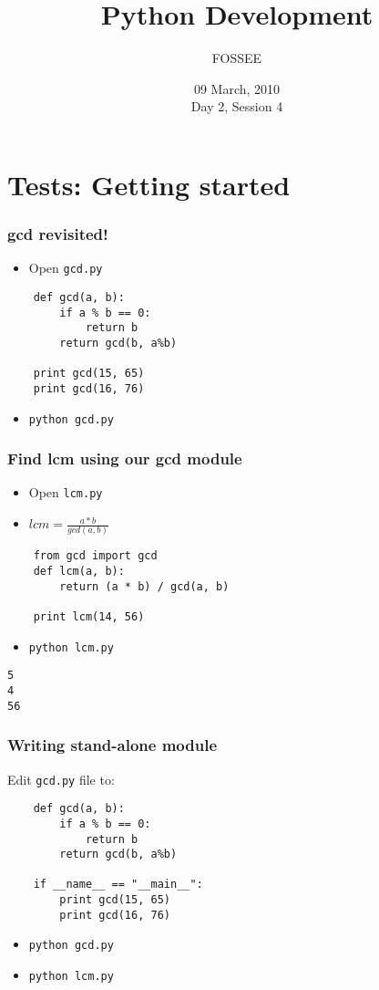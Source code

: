 \documentclass[compress,14pt]{beamer}
\title[Python Development]{Python Development}
\author[FOSSEE] {FOSSEE}
\institute[IIT Bombay] {Department of Aerospace Engineering\\IIT Bombay}
\date[] {09 March, 2010\\Day 2, Session 4}
\begin{document}
\begin{frame}
  \maketitle
\end{frame}

\section{Tests: Getting started}
\begin{frame}[fragile] 
  \frametitle{gcd revisited!}
  \begin{itemize}
  \item Open \texttt{gcd.py}
  \end{itemize}  
\begin{lstlisting}
    def gcd(a, b):
        if a % b == 0: 
            return b
        return gcd(b, a%b)

    print gcd(15, 65)
    print gcd(16, 76)
\end{lstlisting}
  \begin{itemize}
  \item \texttt{python gcd.py}
  \end{itemize}
\end{frame}

\begin{frame}[fragile] 
  \frametitle{Find lcm using our gcd module}
  \begin{itemize}
  \item Open \texttt{lcm.py}  
  \item $lcm = \frac{a * b}{gcd(a,b)}$
  \end{itemize}  
\begin{lstlisting}
    from gcd import gcd    
    def lcm(a, b):
        return (a * b) / gcd(a, b)
    
    print lcm(14, 56)
\end{lstlisting}
  \begin{itemize}
  \item \texttt{python lcm.py}
  \end{itemize}
  \begin{lstlisting}
5
4
56
  \end{lstlisting}    
\end{frame}

\begin{frame}[fragile] 
  \frametitle{Writing stand-alone module}  
Edit \texttt{gcd.py} file to:
\begin{lstlisting}
    def gcd(a, b):
        if a % b == 0: 
            return b
        return gcd(b, a%b)

    if __name__ == "__main__":        
        print gcd(15, 65)
        print gcd(16, 76)
\end{lstlisting}
  \begin{itemize}
  \item \texttt{python gcd.py}
  \item \texttt{python lcm.py}
  \end{itemize}
\end{frame}
\end{document}
